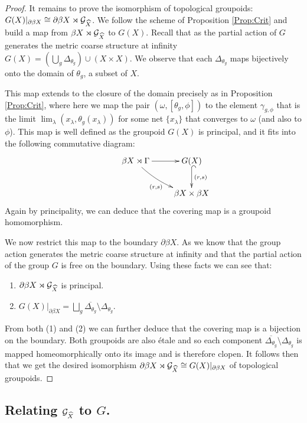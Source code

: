 \begin{conjecture}
\begin{proof}
It remains to prove the isomorphism of topological groupoids: $G(X)|_{\partial\beta X} \cong \partial\beta X \rtimes \mathcal{G}_{\widehat{X}}$. We follow the scheme of Proposition \ref{Prop:Crit} and build a map from $\beta X\rtimes \mathcal{G}_{\widehat{X}}$ to $G(X)$. Recall that as the partial action of $G$ generates the metric coarse structure at infinity $G(X)= (\bigcup_{g} \Delta_{\theta_{g}})\cup (X \times X)$. We observe that each $\Delta_{\theta_{g}}$ maps bijectively onto the domain of $\theta_{g}$, a subset of $X$.

This map extends to the closure of the domain precisely as in Proposition \ref{Prop:Crit}, where here we map the pair $(\omega,[\theta_{g},\phi])$ to the element $\gamma_{g,\phi}$ that is the limit $\lim_{\lambda}(x_{\lambda},\theta_{g}(x_{\lambda}))$ for some net $\lbrace x_{\lambda} \rbrace$ that converges to $\omega$ (and also to $\phi$). This map is well defined as the groupoid $G(X)$ is principal, and it fits into the following commutative diagram:
\begin{equation*}
\xymatrix{
& \beta X \rtimes \Gamma \ar@/_/[rd]_{(r,s)} \ar[r] & G(X) \ar@{^{(}->}[d]^{(r,s)}\\ & & \beta X \times \beta X
}
\end{equation*}
Again by principality, we can deduce that the covering map is a groupoid homomorphism.

We now restrict this map to the boundary $\partial\beta X$. As we know that the group action generates the metric coarse structure at infinity and that the partial action of the group $G$ is free on the boundary. Using these facts we can see that:
\begin{enumerate}
\item $\partial\beta X \rtimes \mathcal{G}_{\widehat{X}}$ is principal.
\item $G(X)|_{\partial\beta X} = \bigsqcup_{g}\overline{\Delta_{\theta_{g}}}\setminus \Delta_{\theta_{g}}$. 
\end{enumerate}
From both (1) and (2) we can further deduce that the covering map is a bijection on the boundary. Both groupoids are also \'etale and so each component $\overline{\Delta_{\theta_{g}}}\setminus \Delta_{\theta_{g}}$ is mapped homeomorphically onto its image and is therefore clopen. It follows then that we get the desired isomorphism $\partial\beta X \rtimes \mathcal{G}_{\widehat{X}} \cong G(X)|_{\partial\beta X}$ of topological groupoids. \end{proof}

\subsection{Relating $\mathcal{G}_{\widehat{X}}$ to $G$.}


\end{conjecture}
